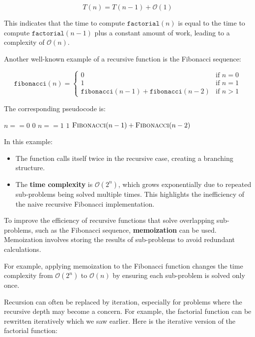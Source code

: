 \[
T(n) = T(n-1) + \mathcal{O}(1)
\]

This indicates that the time to compute $\texttt{factorial}(n)$ is equal to the time to compute $\texttt{factorial}(n-1)$ plus a constant amount of work, leading to a complexity of $\mathcal{O}(n)$.

Another well-known example of a recursive function is the Fibonacci sequence:

\[
\texttt{fibonacci}(n) = 
\begin{cases}
0 & \text{if } n = 0 \\
1 & \text{if } n = 1 \\
\texttt{fibonacci}(n-1) + \texttt{fibonacci}(n-2) & \text{if } n > 1
\end{cases}
\]

The corresponding pseudocode is:

\begin{codebox}
    \li \If $n == 0$ \Then
    \li     \Return $0$
        \End
    \li \If $n == 1$ \Then
    \li     \Return $1$
        \End
    \li \Return $\proc{Fibonacci}(n-1) + \proc{Fibonacci}(n-2)$
\end{codebox}

In this example:
\begin{itemize}
    \item The function calls itself twice in the recursive case, creating a branching structure.
    \item The \textbf{time complexity} is $\mathcal{O}(2^n)$, which grows exponentially due to repeated sub-problems being solved multiple times. This highlights the inefficiency of the naive recursive Fibonacci implementation.
\end{itemize}

To improve the efficiency of recursive functions that solve overlapping sub-problems, such as the Fibonacci sequence, \textbf{memoization} can be used. Memoization involves storing the results of sub-problems to avoid redundant calculations.

For example, applying memoization to the Fibonacci function changes the time complexity from $\mathcal{O}(2^n)$ to $\mathcal{O}(n)$ by ensuring each sub-problem is solved only once.

Recursion can often be replaced by iteration, especially for problems where the recursive depth may become a concern. For example, the factorial function can be rewritten iteratively which we saw earlier. Here is the iterative version of the factorial function:

